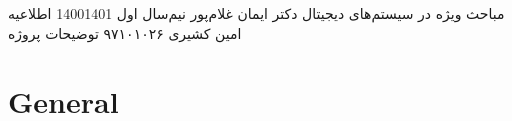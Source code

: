 \documentclass[a4paper,12pt]{article}
\begin{document}
\handout
{مباحث ویژه در سیستم‌های دیجیتال}
{دکتر ایمان غلام‌پور}
{نیم‌سال اول 1400\lr{-}1401}
{اطلاعیه}
{امین کشیری}
{۹۷۱۰۱۰۲۶}
 {توضیحات پروژه}


 

 
\section{General}




\end{document}
